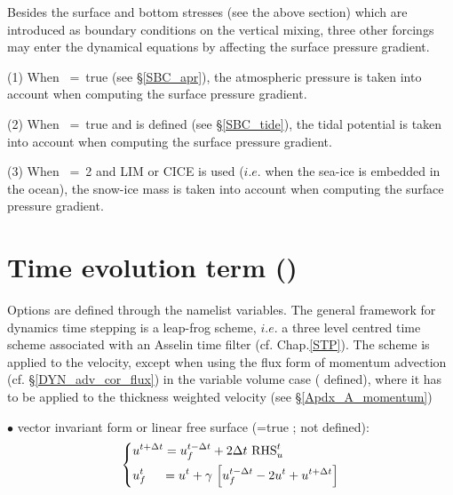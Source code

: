 \documentclass[NEMO_book]{subfiles}
\begin{document}
Besides the surface and bottom stresses (see the above section) which are 
introduced as boundary conditions on the vertical mixing, three other forcings 
may enter the dynamical equations by affecting the surface pressure gradient. 

(1) When ~=~true (see \S\ref{SBC_apr}), the atmospheric pressure is taken 
into account when computing the surface pressure gradient.

(2) When ~=~true and  is defined (see \S\ref{SBC_tide}), 
the tidal potential is taken into account when computing the surface pressure gradient.

(3) When ~=~2 and LIM or CICE is used ($i.e.$ when the sea-ice is embedded in the ocean), 
the snow-ice mass is taken into account when computing the surface pressure gradient.



\section  [Time evolution term (\textit{dynnxt})]
		{Time evolution term ()}
\label{DYN_nxt}


Options are defined through the  namelist variables.
The general framework for dynamics time stepping is a leap-frog scheme, 
$i.e.$ a three level centred time scheme associated with an Asselin time filter 
(cf. Chap.\ref{STP}). The scheme is applied to the velocity, except when using 
the flux form of momentum advection (cf. \S\ref{DYN_adv_cor_flux}) in the variable 
volume case ( defined), where it has to be applied to the thickness 
weighted velocity (see \S\ref{Apdx_A_momentum})  

$\bullet$ vector invariant form or linear free surface (=true ;  not defined):
\begin{equation} \label{Eq_dynnxt_vec}
\left\{   \begin{aligned}
&u^{t+\Delta t} = u_f^{t-\Delta t} + 2\Delta t  \ \text{RHS}_u^t  	\\
&u_f^t \;\quad = u^t+\gamma \,\left[ {u_f^{t-\Delta t} -2u^t+u^{t+\Delta t}} \right]
\end{aligned}   \right.
\end{equation} 
\end{document}
